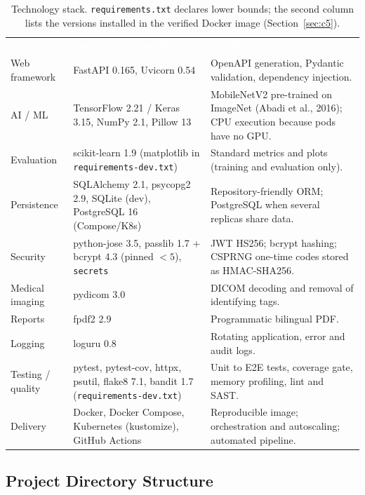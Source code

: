 \documentclass[12pt,a4paper]{article}
\newcommand{\hd}[1]{\textcolor{white}{\textbf{#1}}}
\begin{document}
\begin{table}[H]
\centering
\caption{Technology stack. \texttt{requirements.txt} declares lower bounds; the second column lists the versions installed in the verified Docker image (Section~\ref{sec:c5}).}
\label{tab:stack}
\renewcommand{\arraystretch}{1.3}
\begin{tabularx}{\textwidth}{L{2.7cm} L{4.2cm} Y}
\hd{Layer} & \hd{Technology (installed)} & \hd{Justification} \\
Web framework & FastAPI 0.165, Uvicorn 0.54 & OpenAPI generation, Pydantic validation, dependency injection. \\
AI / ML & TensorFlow 2.21 / Keras 3.15, NumPy 2.1, Pillow 13 & MobileNetV2 pre-trained on ImageNet (Abadi et al., 2016); CPU execution because pods have no GPU. \\
Evaluation & scikit-learn 1.9 (matplotlib in \texttt{requirements-dev.txt}) & Standard metrics and plots (training and evaluation only). \\
Persistence & SQLAlchemy 2.1, psycopg2 2.9, SQLite (dev), PostgreSQL 16 (Compose/K8s) & Repository-friendly ORM; PostgreSQL when several replicas share data. \\
Security & python-jose 3.5, passlib 1.7 + bcrypt 4.3 (pinned $<5$), \texttt{secrets} & JWT HS256; bcrypt hashing; CSPRNG one-time codes stored as HMAC-SHA256. \\
Medical imaging & pydicom 3.0 & DICOM decoding and removal of identifying tags. \\
Reports & fpdf2 2.9 & Programmatic bilingual PDF. \\
Logging & loguru 0.8 & Rotating application, error and audit logs. \\
Testing / quality & pytest, pytest-cov, httpx, psutil, flake8 7.1, bandit 1.7 (\texttt{requirements-dev.txt}) & Unit to E2E tests, coverage gate, memory profiling, lint and SAST. \\
Delivery & Docker, Docker Compose, Kubernetes (kustomize), GitHub Actions & Reproducible image; orchestration and autoscaling; automated pipeline. \\
\end{tabularx}
\end{table}

\subsection{Project Directory Structure}
\end{document}
